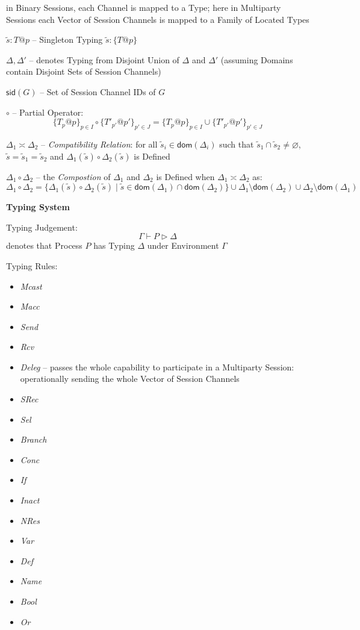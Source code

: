 in Binary Sessions, each Channel is mapped to a Type; here in
Multiparty Sessions each Vector of Session Channels is mapped to a
Family of Located Types

$\tilde{s} : T @ p$ -- Singleton Typing $\tilde{s} : \{ T @ p \}$

$\Delta,\Delta'$ -- denotes Typing from Disjoint Union of $\Delta$ and
$\Delta'$ (assuming Domains contain Disjoint Sets of Session Channels)

$\mathsf{sid}(G)$ -- Set of Session Channel IDs of $G$

$\circ$ -- Partial Operator:
\[
  \{ T_p @ p \}_{p \in I} \circ \{ T'_{p'} @ p' \}_{p' \in J} =
    \{ T_p @ p \}_{p \in I} \cup \{ T'_{p'} @ p' \}_{p' \in J}
\]

$\Delta_1 \asymp \Delta_2$ -- \emph{Compatibility Relation}: for all
$\tilde{s}_i \in \mathsf{dom}(\Delta_i)$ such that $\tilde{s}_1 \cap
\tilde{s}_2 \neq \varnothing$, $\tilde{s} = \tilde{s}_1 = \tilde{s}_2$
and $\Delta_1(\tilde{s}) \circ \Delta_2(\tilde{s})$ is Defined

$\Delta_1 \circ \Delta_2$ -- the \emph{Compostion} of $\Delta_1$ and
$\Delta_2$ is Defined when $\Delta_1 \asymp \Delta_2$ as:
\[
  \Delta_1 \circ \Delta_2 =
    \{ \Delta_1(\tilde{s}) \circ \Delta_2(\tilde{s})
      \;|\; \tilde{s} \in
      \mathsf{dom}(\Delta_1) \cap \mathsf{dom}(\Delta_2) \}
    \cup \Delta_1 \setminus \mathsf{dom}(\Delta_2)
    \cup \Delta_2 \setminus \mathsf{dom}(\Delta_1)
\]


\textbf{Typing System}

Typing Judgement:
\[
  \Gamma \vdash P \rhd \Delta
\]
denotes that Process $P$ has Typing $\Delta$ under Environment
$\Gamma$

Typing Rules:
\begin{itemize}
  \item \emph{Mcast}
  \item \emph{Macc}
  \item \emph{Send}
  \item \emph{Rcv}
  \item \emph{Deleg} -- passes the whole capability to participate in
    a Multiparty Session: operationally sending the whole Vector of
    Session Channels
  \item \emph{SRec}
  \item \emph{Sel}
  \item \emph{Branch}
  \item \emph{Conc}
  \item \emph{If}
  \item \emph{Inact}
  \item \emph{NRes}
  \item \emph{Var}
  \item \emph{Def}
  \item \emph{Name}
  \item \emph{Bool}
  \item \emph{Or}
\end{itemize}

